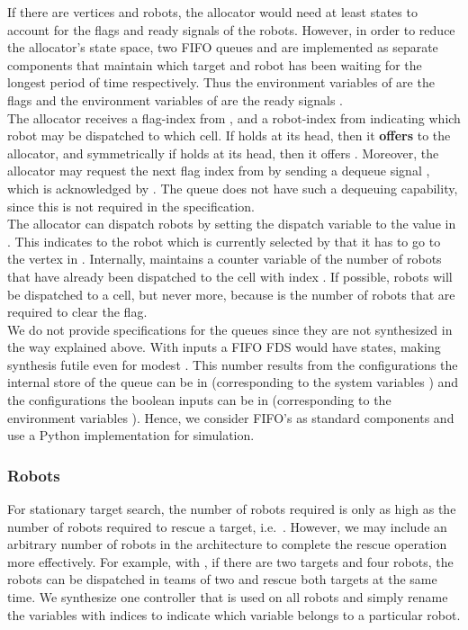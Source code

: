 If there are  vertices and  robots, the allocator would need at least  states to account for the  flags and  ready signals of the robots. However, in order to reduce the allocator's state space, two FIFO queues  and  are implemented as separate components that maintain which target and robot has been waiting for the longest period of time respectively. Thus the environment variables of  are the flags  and the environment variables of  are the ready signals .\\

The allocator receives a flag-index  from , and a robot-index  from  indicating which robot may be dispatched to which cell. If  holds  at its head, then it {\bf offers}  to the allocator, and symmetrically if  holds  at its head, then it offers . Moreover, the allocator may request the next flag index from  by sending a dequeue signal , which is acknowledged by . The queue  does not have such a dequeuing capability, since this is not required in the specification.\\

The allocator can dispatch robots by setting the dispatch variable  to the value in . This indicates to the robot which is currently selected by  that it has to go to the vertex in . Internally,  maintains a counter variable  of the number of robots that have already been dispatched to the cell with index . If possible,  robots will be dispatched to a cell, but never more, because  is the number of robots that are required to clear the flag.\\

We do not provide specifications for the queues since they are not synthesized in the way explained above. With  inputs a FIFO FDS would have  states, making synthesis futile even for modest . This number results from the  configurations the internal store of the queue can be in (corresponding to the system variables ) and the  configurations the boolean inputs can be in (corresponding to the environment variables ). Hence, we consider FIFO's as standard components and use a Python implementation for simulation.\\


\subsubsection{Robots}

For stationary target search, the number of robots required is only as high as the number of robots required to rescue a target, i.e.\ . However, we may include an arbitrary number of robots in the architecture to complete the rescue operation more effectively. For example, with , if there are two targets and four robots, the robots can be dispatched in teams of two and rescue both targets at the same time. We synthesize one controller that is used on all robots and simply rename the variables with indices to indicate which variable belongs to a particular robot.\\


